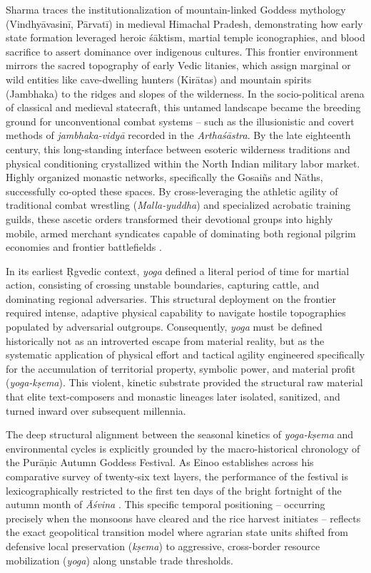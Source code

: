 \documentclass[11pt,twoside,letterpaper]{article}
\begin{document}
Sharma \cite{sharma2006} traces the institutionalization of mountain-linked Goddess mythology (Vindhyāvasinī, Pārvatī) in medieval Himachal Pradesh, demonstrating how early state formation leveraged heroic śāktism, martial temple iconographies, and blood sacrifice to assert dominance over indigenous cultures. This frontier environment mirrors the sacred topography of early Vedic litanies, which assign marginal or wild entities like cave-dwelling hunters (Kirātas) and mountain spirits (Jambhaka) to the ridges and slopes of the wilderness. In the socio-political arena of classical and medieval statecraft, this untamed landscape became the breeding ground for unconventional combat systems -- such as the illusionistic and covert methods of \textit{jambhaka-vidyā} recorded in the \textit{Arthaśāstra}. By the late eighteenth century, this long-standing interface between esoteric wilderness traditions and physical conditioning crystallized within the North Indian military labor market. Highly organized monastic networks, specifically the Gosaiñs and Nāths, successfully co-opted these spaces. By cross-leveraging the athletic agility of traditional combat wrestling (\textit{Malla-yuddha}) and specialized acrobatic training guilds, these ascetic orders transformed their devotional groups into highly mobile, armed merchant syndicates capable of dominating both regional pilgrim economies and frontier battlefields \citep{pinch1999, pinch2012a, pinch2012b, pinch2020}.  

In its earliest Ṛgvedic context, \textit{yoga} defined a literal period of time for martial action, consisting of crossing unstable boundaries, capturing cattle, and dominating regional adversaries. This structural deployment on the frontier required intense, adaptive physical capability to navigate hostile topographies populated by adversarial outgroups. Consequently, \textit{yoga} must be defined historically not as an introverted escape from material reality, but as the systematic application of physical effort and tactical agility engineered specifically for the accumulation of territorial property, symbolic power, and material profit (\textit{yoga-kṣema}). This violent, kinetic substrate provided the structural raw material that elite text-composers and monastic lineages later isolated, sanitized, and turned inward over subsequent millennia.

The deep structural alignment between the seasonal kinetics of \textit{yoga-kṣema} and environmental cycles is explicitly grounded by the macro-historical chronology of the Purāṇic Autumn Goddess Festival. As Einoo establishes across his comparative survey of twenty-six text layers, the performance of the festival is lexicographically restricted to the first ten days of the bright fortnight of the autumn month of \textit{Āśvina} \citep{Einoo1999}. This specific temporal positioning -- occurring precisely when the monsoons have cleared and the rice harvest initiates -- reflects the exact geopolitical transition model where agrarian state units shifted from defensive local preservation (\textit{kṣema}) to aggressive, cross-border resource mobilization (\textit{yoga}) along unstable trade thresholds.
\end{document}
